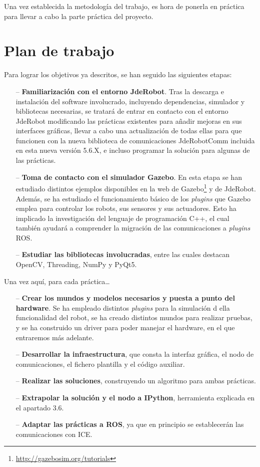 Una vez establecida la metodología del trabajo, es hora de ponerla en práctica para llevar a cabo la parte práctica del proyecto.

\section{Plan de trabajo}
Para lograr los objetivos ya descritos, se han seguido las siguientes etapas:

\begin{itemize}
	\item[--] \textbf{Familiarización con el entorno JdeRobot}. Tras la descarga e instalación del software  involucrado, incluyendo dependencias, simulador y bibliotecas necesarias, se tratará de entrar en contacto con el entorno JdeRobot modificando las prácticas existentes para añadir mejoras en sus interfaces gráficas, llevar a cabo una actualización de todas ellas para que funcionen con la nueva biblioteca de comunicaciones JdeRobotComm incluida en esta nueva versión 5.6.X, e incluso programar la solución para algunas de las prácticas.
	\item[--] \textbf{Toma de contacto con el simulador Gazebo}. En esta etapa se han estudiado distintos ejemplos disponibles en la web de Gazebo\footnote{\url{http://gazebosim.org/tutorials}} y de JdeRobot. Además, se ha estudiado el funcionamiento básico de los \textit{plugins}  que Gazebo emplea para controlar los robots, sus sensores y sus actuadores. Esto ha implicado la investigación del lenguaje de programación C++, el cual también ayudará a comprender la migración de las comunicaciones a \textit{plugins} ROS.
	\item[--] \textbf{Estudiar las bibliotecas involucradas}, entre las cuales destacan OpenCV, Threading, NumPy y PyQt5.
\end{itemize}

Una vez aquí, para cada práctica…

\begin{itemize}
	\item[--] \textbf{Crear los mundos y modelos necesarios y puesta a punto del hardware}.  Se ha empleado distintos \textit{plugins} para la simulación d ella funcionalidad del robot, se ha creado distintos mundos para realizar pruebas, y se ha construido un driver para poder manejar el hardware, en el que entraremos más adelante.
	\item[--] \textbf{Desarrollar la infraestructura}, que consta la interfaz gráfica, el nodo de comunicaciones, el fichero plantilla y el código auxiliar.
	\item[--] \textbf{Realizar las soluciones}, construyendo un algoritmo para ambas prácticas.
	\item[--] \textbf{Extrapolar la solución y el nodo a IPython}, herramienta explicada en el apartado 3.6.
	\item[--] \textbf{Adaptar las prácticas a ROS}, ya que en principio se establecerán las comunicaciones con ICE. 
\end{itemize}